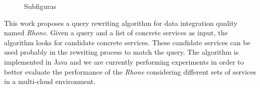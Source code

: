 \documentclass{sig-alternate}
\begin{document}
\begin{figure}[!htb]
\centering
{}
\quad %
\caption{Subfiguras}
\label{fig01}
\end{figure}
%
%

This work proposes a query rewriting algorithm for data integration quality
named \textit{Rhone}. Given a query and a list of concrete services as input,
the algorithm looks for candidate concrete services. These candidate services can be used probably in the rewriting
process to match the query. The algorithm is implemented in Java and we are
currently performing experiments in order to better evaluate the performance of
the \textit{Rhone} considering different sets of services in a multi-cloud environment.


%
{\tiny

  
}
\end{document}
